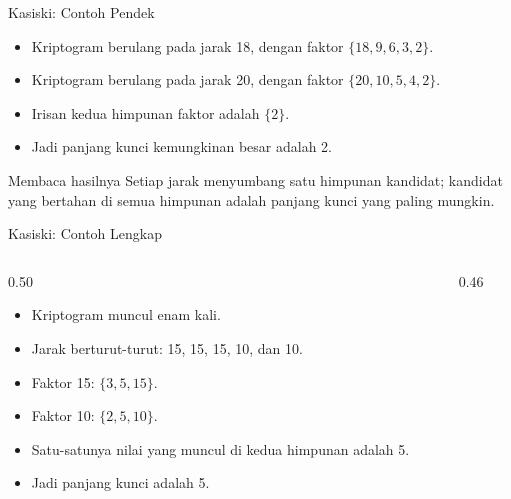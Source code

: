 \documentclass[aspectratio=169,11pt]{beamer}
\begin{document}
\begin{frame}{Kasiski: Contoh Pendek}
    \footnotesize
    \begin{itemize}
        \item Kriptogram  berulang pada jarak 18, dengan faktor
              $\{18,9,6,3,2\}$.
        \item Kriptogram  berulang pada jarak 20, dengan faktor
              $\{20,10,5,4,2\}$.
        \item Irisan kedua himpunan faktor adalah $\{2\}$.
        \item Jadi panjang kunci kemungkinan besar adalah 2.
    \end{itemize}
    \vspace{0.15cm}
    \begin{block}{Membaca hasilnya}
        \footnotesize
        Setiap jarak menyumbang satu himpunan kandidat; kandidat yang bertahan
        di semua himpunan adalah panjang kunci yang paling mungkin.
    \end{block}
\end{frame}

\begin{frame}{Kasiski: Contoh Lengkap }
    \begin{columns}[T,onlytextwidth]
        \begin{column}{0.50\textwidth}
            \footnotesize
            \begin{itemize}
                \item Kriptogram  muncul enam kali.
                \item Jarak berturut-turut: 15, 15, 15, 10, dan 10.
                \item Faktor 15: $\{3,5,15\}$.
                \item Faktor 10: $\{2,5,10\}$.
                \item Satu-satunya nilai yang muncul di kedua himpunan adalah
                      5.
                \item Jadi panjang kunci adalah 5.
            \end{itemize}
        \end{column}
        \begin{column}{0.46\textwidth}
            \centering
        \end{column}
    \end{columns}
\end{frame}
\end{document}
